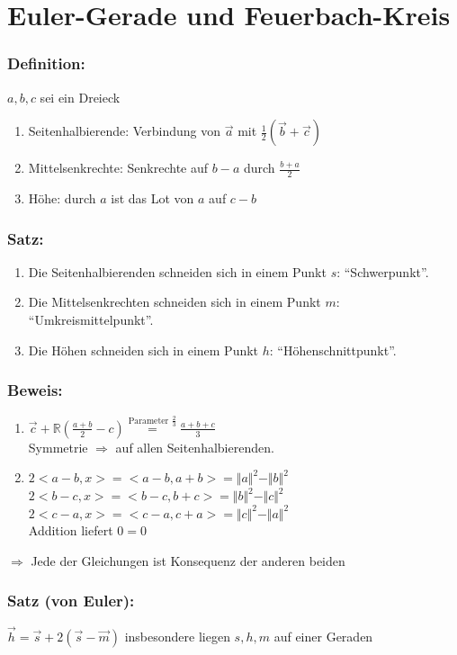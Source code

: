 \section{Euler-Gerade und Feuerbach-Kreis}
%
%
%
\subsubsection{Definition:}
$a,b,c$ sei ein Dreieck
\begin{enumerate}
	\item Seitenhalbierende: Verbindung von $\vec{a}$ mit $\frac{1}{2}(\vec{b}+\vec{c})$
	\item Mittelsenkrechte: Senkrechte auf $b-a$ durch $\frac{b+a}{2}$
	\item Höhe: durch $a$ ist das Lot von $a$ auf $c-b$
\end{enumerate}
%
%
%
\subsubsection{Satz:}
\begin{enumerate}
	\item Die Seitenhalbierenden schneiden sich in einem Punkt $s$: "`Schwerpunkt"'.
	\item Die Mittelsenkrechten schneiden sich in einem Punkt $m$:
	 "`Umkreismittelpunkt"'.
	\item Die Höhen schneiden sich in einem Punkt $h$: "`Höhenschnittpunkt"'.
\end{enumerate}
%
%
%
\subsubsection{Beweis:}
\begin{enumerate}
	\item $\vec{c}+\mathbb{R}(\frac{a+b}{2}-c)\mathop{=}\limits^{\textrm{Parameter 
	}\frac{2}{3}}\frac{a+b+c}{3}$\\
	Symmetrie $\Rightarrow$ auf allen Seitenhalbierenden.
	\item $2<a-b,x>=<a-b,a+b>=\Vert a\Vert^{2}-\Vert b\Vert^{2}$\\
	$2<b-c,x>=<b-c,b+c>=\Vert b \Vert^{2}-\Vert c \Vert^{2}$\\
	$2<c-a,x>=<c-a,c+a>=\Vert c \Vert^{2}-\Vert a\Vert^{2}$\\
	Addition liefert $0=0$
\end{enumerate}
$\Rightarrow$ Jede der Gleichungen ist Konsequenz der anderen beiden
%
%
%
\subsubsection{Satz (von Euler):}
$\vec{h}=\vec{s}+2(\vec{s}-\vec{m})$ insbesondere liegen $s,h,m$ auf einer Geraden
%
%
%
